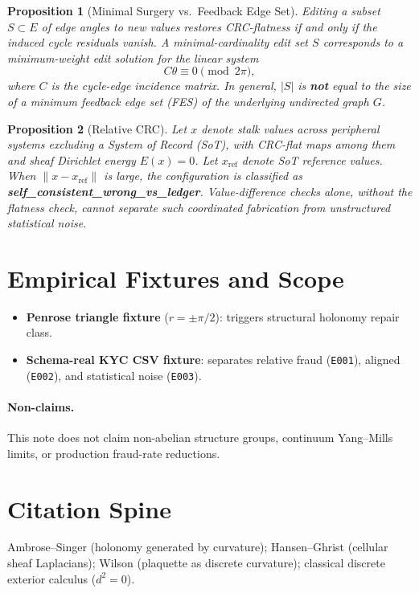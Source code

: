 \documentclass[11pt]{article}
\newtheorem{proposition}{Proposition}
\begin{document}
\begin{proposition}[Minimal Surgery vs.\ Feedback Edge Set]
Editing a subset $S \subset E$ of edge angles to new values restores CRC-flatness if and only if the induced cycle residuals vanish. A minimal-cardinality edit set $S$ corresponds to a minimum-weight edit solution for the linear system
\begin{equation}
  C\theta \equiv 0 \pmod{2\pi},
\end{equation}
where $C$ is the cycle-edge incidence matrix. In general, $|S|$ is \textbf{not} equal to the size of a minimum feedback edge set (FES) of the underlying undirected graph $G$.
\end{proposition}

\begin{proposition}[Relative CRC]
Let $x$ denote stalk values across peripheral systems excluding a System of Record (SoT), with CRC-flat maps among them and sheaf Dirichlet energy $E(x) = 0$. Let $x_{\mathrm{ref}}$ denote SoT reference values. When $\|x - x_{\mathrm{ref}}\|$ is large, the configuration is classified as \textbf{self\_consistent\_wrong\_vs\_ledger}. Value-difference checks alone, without the flatness check, cannot separate such coordinated fabrication from unstructured statistical noise.
\end{proposition}

\section{Empirical Fixtures and Scope}
\begin{itemize}
  \item \textbf{Penrose triangle fixture} ($r = \pm \pi/2$): triggers structural holonomy repair class.
  \item \textbf{Schema-real KYC CSV fixture}: separates relative fraud (\texttt{E001}), aligned (\texttt{E002}), and statistical noise (\texttt{E003}).
\end{itemize}

\paragraph{Non-claims.} This note does not claim non-abelian structure groups, continuum Yang--Mills limits, or production fraud-rate reductions.

\section{Citation Spine}
Ambrose--Singer (holonomy generated by curvature); Hansen--Ghrist (cellular sheaf Laplacians); Wilson (plaquette as discrete curvature); classical discrete exterior calculus ($d^2 = 0$).
\end{document}
